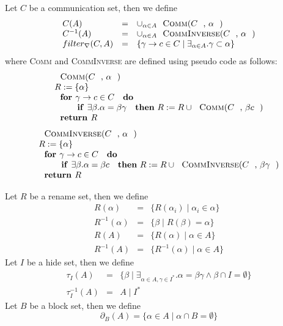 \documentclass{article}
\begin{document}
Let $C$ be a communication set, then we define%
\[
\begin{array}{lll}
C(A) & = & \cup _{\alpha \in A}\text{\textsc{Comm}(}C\text{, }\alpha \text{)}
\\ 
C^{-1}(A) & = & \cup _{\alpha \in A}\text{\textsc{CommInverse}(}C\text{, }%
\alpha \text{)} \\ 
filter_{\nabla }(C,A) & = & \{\gamma \rightarrow c\in C\mid \exists _{\alpha
\in A}.\gamma \subset \alpha \}%
\end{array}%
\]%
where \textsc{Comm} and \textsc{CommInverse} are defined using pseudo code
as follows:%
\[
\begin{array}{l}
\text{\textsc{Comm}(}C\text{, }\alpha \text{)} \\ 
R:=\{\alpha \} \\ 
\text{\textbf{for }}\gamma \rightarrow c\in C\text{ \textbf{do}} \\ 
\qquad \text{\textbf{if }}\exists \beta .\alpha =\beta \gamma \text{ \textbf{%
then} }R:=R\cup \text{\textsc{Comm}(}C\text{, }\beta c\text{)} \\ 
\text{\textbf{return }}R%
\end{array}%
\]%
\[
\begin{array}{l}
\text{\textsc{CommInverse}(}C\text{, }\alpha \text{)} \\ 
R:=\{\alpha \} \\ 
\text{\textbf{for }}\gamma \rightarrow c\in C\text{ \textbf{do}} \\ 
\qquad \text{\textbf{if }}\exists \beta .\alpha =\beta c\text{ \textbf{then} 
}R:=R\cup \text{\textsc{CommInverse}(}C\text{, }\beta \gamma \text{)} \\ 
\text{\textbf{return }}R%
\end{array}%
\]

Let $R$ be a rename set, then we define%
\[
\begin{array}{lll}
R(\alpha ) & = & \{R(\alpha _{i})\mid \alpha _{i}\in \alpha \} \\ 
R^{-1}(\alpha ) & = & \{\beta \mid R(\beta )=\alpha \} \\ 
R(A) & = & \{R(\alpha )\mid \alpha \in A\} \\ 
R^{-1}(A) & = & \{R^{-1}(\alpha )\mid \alpha \in A\}%
\end{array}%
\]%
Let $I$ be a hide set, then we define%
\[
\begin{array}{ccc}
\tau _{I}(A) & = & \{\beta \mid \exists _{\alpha \in A,\gamma \in I^{\ast
}}.\alpha =\beta \gamma \wedge \beta \cap I=\emptyset \} \\ 
\tau _{I}^{-1}(A) & = & A\mid I^{\ast }%
\end{array}%
\]%
Let $B$ be a block set, then we define%
\[
\partial _{B}(A)=\{\alpha \in A\mid \alpha \cap B=\emptyset \} 
\]
\end{document}
